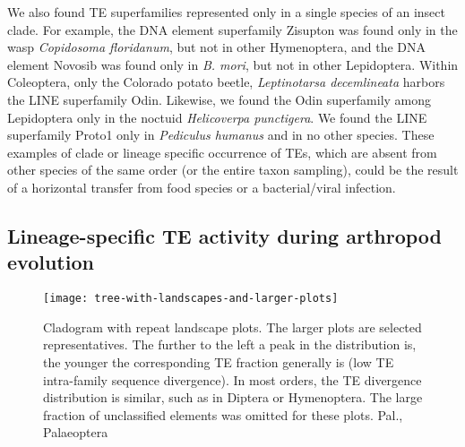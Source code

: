 We also found TE superfamilies represented only in a single species of
an insect clade. For example, the DNA element superfamily Zisupton was
found only in the wasp \emph{Copidosoma floridanum}, but not in other
Hymenoptera, and the DNA element Novosib was found only in \emph{B.
mori}, but not in other Lepidoptera. Within Coleoptera, only the
Colorado potato beetle, \emph{Leptinotarsa decemlineata} harbors the
LINE superfamily Odin. Likewise, we found the Odin superfamily among
Lepidoptera only in the noctuid \emph{Helicoverpa punctigera}. We found
the LINE superfamily Proto1 only in \emph{Pediculus humanus} and in no
other species. These examples of clade or lineage specific occurrence of
TEs, which are absent from other species of the same order (or the
entire taxon sampling), could be the result of a horizontal transfer
from food species or a bacterial/viral infection.



\subsection{Lineage-specific TE activity during arthropod
evolution}\label{lineage-specific-te-activity-during-arthropod-evolution}

\begin{figure}[h!]
\begin{center}
\texttt{[image: tree-with-landscapes-and-larger-plots]}
\caption{{Cladogram with repeat landscape plots. The larger plots are selected
representatives. The further to the left a peak in the distribution is,
the younger the corresponding TE fraction generally is (low TE
intra-family sequence divergence). In most orders, the TE divergence
distribution is similar, such as in Diptera or Hymenoptera. The large
fraction of unclassified elements was omitted for these plots. Pal.,
Palaeoptera%
}}%
\label{fig:landscapes}%
\end{center}
\end{figure}

